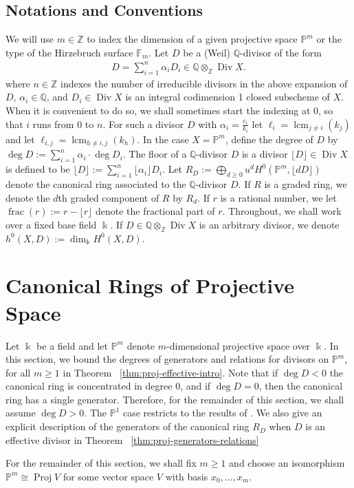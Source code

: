 \documentclass{amsart}
\theoremstyle{plain}
\theoremstyle{definition}
\theoremstyle{remark}
\numberwithin{equation}{section}
\newcommand\ssec{\subsection}
\newcommand\bq{{\mathbb Q}}
\newcommand\bp{{\mathbb P}}
\newcommand\bz{{\mathbb Z}}
\newcommand\bk{{\Bbbk}}
\DeclareMathOperator\di{Div}
\newcommand\hirz{\mathbb{F}}
\DeclareMathOperator{\fr}{frac}
\DeclareMathOperator{\proj}{Proj}
\DeclareMathOperator{\lcm}{lcm}
\begin{document}
\ssec{Notations and Conventions}
We will use $m \in \bz$ to index the dimension of a given projective
space $\bp^m$ or the type of the Hirzebruch surface $\hirz_m$.
Let $D$ be a (Weil) $\bq$-divisor of the form
\begin{align*}
	D = \sum_{i=1}^{n}\alpha_i D_i \in \bq \otimes_\bz \di X.
\end{align*}\noindent
where $n \in \bz$ indexes the number of irreducible divisors in 
the above expansion of $D$, $\alpha_i \in \bq$, and $D_i \in \di X$ is an integral
codimension 1 closed subscheme of $X$. When it is convenient to do
so, we shall sometimes start the indexing at $0$, so that $i$ runs
from $0$ to $n$. For such a divisor $D$ with $\alpha_i =
\frac{c_i}{k_i}$ let $\ell_i = \lcm_{j\ne i}(k_j)$
and let $\ell_{i,j} = \lcm_{h\ne i,j}(k_h).$ In the case $X = \bp^m$, define the degree of $D$ by $\deg D :=
\sum_{i=1}^{n}\alpha_i \cdot \deg D_i$. The floor of a $\bq$-divisor $D$ is a divisor $\lfloor D
\rfloor \in \di X$ is defined to be $\lfloor D \rfloor := \sum_{i = 1}^{n}
\lfloor \alpha_i \rfloor D_i$. Let $
	R_D := \bigoplus_{d \geq 0} u^d H^0(\bp^m, \lfloor dD \rfloor)$
denote the canonical ring associated to the $\bq$-divisor $D$. If $R$
is a graded ring, we denote the $d$th graded component of $R$ by $R_d$. If $r$ is a rational number, we let
$\fr(r) := r - \lfloor r
\rfloor$ denote the fractional part of $r$. Throughout, we
shall work over a fixed base field $\bk$. If $D \in \bq \otimes_\bz
\di X$ is an arbitrary divisor, we denote $h^0(X, D) := \dim_\bk H^0(X,D)$.


\section{Canonical Rings of Projective Space}
\label{sec:proj}
Let $\bk$ be a field and let $\bp^m$ denote $m$-dimensional
projective space over $\bk$. In this section, we bound the degrees
of generators and relations for divisors
on $\bp^m$, for all $m \geq 1$ in Theorem
~\ref{thm:proj-effective-intro}.
Note that if $\deg D < 0$ the
canonical ring is concentrated in degree 0, and if
$\deg D = 0$, then the canonical ring has a single
generator. Therefore, for the remainder of this section,
we shall assume $\deg D > 0$.
The $\bp^1$ case restricts to the results of
\cite{dorney:canonical}. We also give an explicit description of the
generators of the canonical ring $R_D$ when $D$ is an effective divisor in Theorem ~\ref{thm:proj-generators-relations}


For the remainder of this section, we shall fix $m \geq 1$ and
choose an
isomorphism $\bp^m \cong \proj V$ for some vector space $V$ with
basis $x_0,\ldots, x_m$.
\end{document}
